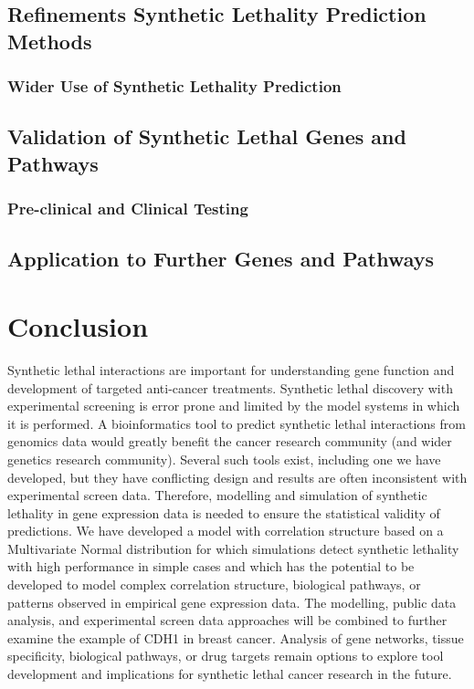 \subsection{Refinements Synthetic Lethality Prediction Methods}
\label{chapt6:future_slipt_method}


\subsubsection{Wider Use of Synthetic Lethality Prediction}
\label{chapt6:future_slipt_data}


\subsection{Validation of Synthetic Lethal Genes and Pathways}
\label{chapt6:future_cdh1}

\subsubsection{Pre-clinical and Clinical Testing}
\label{chapt6:future_clinic}

\subsection{Application to Further Genes and Pathways}
\label{chapt6:future_slipt}

\clearpage
\section{Conclusion}
\label{chap:conclusion}

Synthetic lethal interactions are important for understanding gene function and development of targeted anti-cancer treatments.  Synthetic lethal discovery with experimental screening is error prone and limited by the model systems in which it is performed.  A bioinformatics tool to predict synthetic lethal interactions from genomics data would greatly benefit the cancer research community (and wider genetics research community).  Several such tools exist, including one we have developed, but they have conflicting design and results are often inconsistent with experimental screen data. Therefore, modelling and simulation of synthetic lethality in gene expression data is needed to ensure the statistical validity of predictions.  We have developed a model with correlation structure based on a Multivariate Normal distribution for which simulations detect synthetic lethality with high performance in simple cases and which has the potential to be developed to model complex correlation structure, biological pathways, or patterns observed in empirical gene expression data.  The modelling, public data analysis, and experimental screen data approaches will be combined to further examine the example of CDH1 in breast cancer.  Analysis of gene networks, tissue specificity, biological pathways, or drug targets remain options to explore tool development and implications for synthetic lethal cancer research in the future. 


